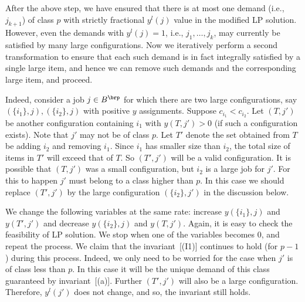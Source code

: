 After the above step, we have ensured that there is at most one demand (i.e., $j_{k+1}$) of class $p$
with strictly fractional $y^l(j)$ value in the modified LP solution. However, even the demands with $y^l(j) = 1$, i.e.,  $j_1, \ldots, j_k$,  may currently be satisfied by many large configurations. Now we iteratively perform a second transformation to ensure that each such demand is in fact integrally satisfied by a single large item, and hence we can remove such demands and the corresponding large item, and proceed.

Indeed, consider a  job $j \in B^\brp$ for which there are two large configurations, say $(\{i_1\}, j), (\{i_2\}, j)$ with positive $y$ assignments. Suppose $c_{i_1} < c_{i_2}$. Let $(T,j')$ be another configuration containing $i_1$ with $y(T,j') > 0$ (if such a configuration exists). Note that $j'$ may not be of class $p$. Let $T'$ denote the set obtained from $T$ be adding $i_2$ and removing $i_1$. Since $i_1$ has smaller size than $i_2$, the total size of items in $T'$ will exceed that of $T$. So $(T',j')$ will be a valid configuration. It is possible that $(T,j')$ was a small configuration, but $i_2$ is a large job for $j'$. For this to happen $j'$ must belong to a class higher than $p$. In this case we should replace $(T',j')$ by the large configuration $(\{i_2\},j')$ in the discussion below. %


We change the following variables at the same rate: increase $y(\{i_1\},j)$ and $y(T',j')$ and decrease $y(\{i_2\},j)$ and $y(T,j')$. Again, it is easy to check the feasibility of LP solution. We stop when one of the variables becomes 0, and repeat the process. We claim that the invariant~[(I1)] continues
to hold (for $p-1$) during this process. Indeed, we only need to be worried for the case when $j'$ is of class less than $p$.  In this case it will be the unique demand  of this class guaranteed by invariant~[(a)]. Further $(T',j')$ will also be a large configuration. Therefore, $y^l(j')$ does not change, and so,
the invariant still holds.

